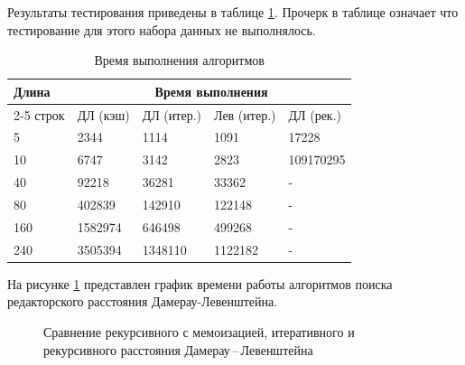 Результаты тестирования приведены в таблице \ref{time-table}. Прочерк в таблице означает что тестирование для этого набора данных не выполнялось.

\begin{table}[ht!]
	\begin{center}
		\caption{Время выполнения алгоритмов}
		\begin{tabular}{ ||p{1.5cm}||p{2cm}|p{2cm}|p{2cm}|p{3.5cm}||  }
			\hline
			\multirow{2}{*}{Длина}& \multicolumn{4}{c||}{Время выполнения} \\[1.5ex]
			\cline{2-5} 
			строк& ДЛ (кэш)  & ДЛ (итер.) & Лев (итер.) & ДЛ (рек.) \\ [1.5ex] 
			\hline\hline
			5  & 2344 & 1114 & 1091 & 17228 \\
			10 & 6747 & 3142 & 2823 & 109170295 \\
			40 & 92218 & 36281 & 33362 &  - \\
			80 & 402839 & 142910 & 122148 & - \\
			160 & 1582974 & 646498 & 499268 & - \\
			240 & 3505394 & 1348110 & 1122182 & - \\
			\hline
		\end{tabular}
		\label{time-table}
	\end{center}
\end{table}

\newpage

На рисунке \ref{graf:del-rec} представлен график времени работы алгоритмов поиска редакторского расстояния Дамерау-Левенштейна.

\begin{figure}[ht!]
	\begin{center}
	
	\end{center}
	\caption{Сравнение рекурсивного с мемоизацией, итеративного и рекурсивного расстояния Дамерау\,--\,Левенштейна}
	\label{graf:del-rec}
\end{figure}

